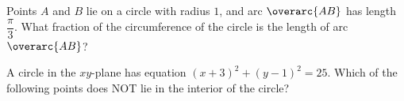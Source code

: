 
\vspace{2em}

\noindent\markforreview
\vspace{1em}

Points $A$ and $B$ lie on a circle with radius $1$, and arc $\overarc{AB}$ has length $\dfrac{\pi}{3}$. What fraction of the circumference of the circle is the length of arc $\overarc{AB}$?

\vspace{2em}

\noindent\markforreview
\vspace{1em}

A circle in the $xy$-plane has equation $(x + 3)^2 + (y - 1)^2 = 25$. Which of the following points does NOT lie in the interior of the circle?

\vspace{0.75em}















